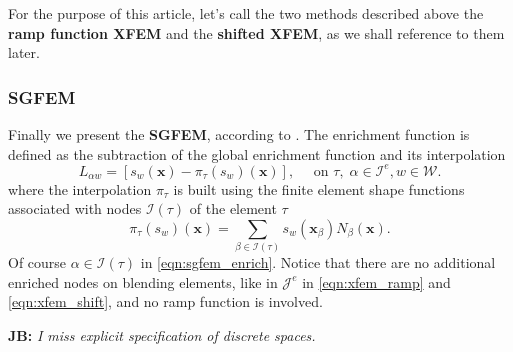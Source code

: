 \documentclass[preprint,12pt]{elsarticle}
\def\vc#1{\mathbf{\boldsymbol{#1}}}     %
\newcommand{\bx}{\vc{x}}
\newcommand{\noteJB}[1]{{\color{Blue} \textbf{JB: } \textit{#1}}}
\begin{document}
For the purpose of this article, let's call the two methods described above the \textbf{ramp function XFEM}  
and the \textbf{shifted XFEM}, as we shall reference to them later.

\subsubsection{SGFEM}
Finally we present the \textbf{SGFEM}, according to \cite{sgfem,sgfem2013}. The enrichment function is defined
as the subtraction of the global enrichment function and its interpolation 
\begin{equation} \label{eqn:sgfem_enrich}
    L_{\alpha w} = \left[s_w(\bx) - \pi_\tau (s_w)(\bx)\right],
    \quad \textrm{ on } \tau,\; \alpha\in\mathcal{I}^e, w\in\mathcal{W}.
\end{equation} 
where the interpolation $\pi_\tau$ is built using the finite element shape functions
associated with nodes $\mathcal{I}(\tau)$ of the element $\tau$
\begin{equation} \label{eqn:sgfem_interpolation}
    \pi_\tau (s_w)(\bx) = \sum\limits_{\beta\in\mathcal{I}(\tau)} s_w(\bx_\beta) N_\beta(\bx).
\end{equation}
Of course $\alpha\in\mathcal{I}(\tau)$ in \eqref{eqn:sgfem_enrich}.
Notice that there are no additional enriched nodes on blending elements, like in $\mathcal{J}^e$ in 
\eqref{eqn:xfem_ramp} and \eqref{eqn:xfem_shift}, and no ramp function is involved.

\noteJB{I miss explicit specification of discrete spaces.}
\end{document}

